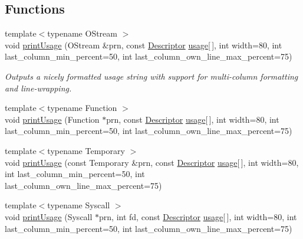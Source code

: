 \subsection*{Functions}
\begin{DoxyCompactItemize}
\item 
{\footnotesize template$<$typename O\-Stream $>$ }\\void \hyperlink{namespace_option_parser_a2458d437c7f439220d0b3581a5db56b1}{print\-Usage} (O\-Stream \&prn, const \hyperlink{struct_option_parser_1_1_descriptor}{Descriptor} \hyperlink{_selective_community_detection-_x_8cpp_ae4e685e845abde182eb8fc1f87b756ae}{usage}\mbox{[}$\,$\mbox{]}, int width=80, int last\-\_\-column\-\_\-min\-\_\-percent=50, int last\-\_\-column\-\_\-own\-\_\-line\-\_\-max\-\_\-percent=75)
\begin{DoxyCompactList}\small\item\em Outputs a nicely formatted usage string with support for multi-\/column formatting and line-\/wrapping. \end{DoxyCompactList}\item 
{\footnotesize template$<$typename Function $>$ }\\void \hyperlink{namespace_option_parser_a5901bd1e298e40bf2907f55cef137036}{print\-Usage} (Function $\ast$prn, const \hyperlink{struct_option_parser_1_1_descriptor}{Descriptor} \hyperlink{_selective_community_detection-_x_8cpp_ae4e685e845abde182eb8fc1f87b756ae}{usage}\mbox{[}$\,$\mbox{]}, int width=80, int last\-\_\-column\-\_\-min\-\_\-percent=50, int last\-\_\-column\-\_\-own\-\_\-line\-\_\-max\-\_\-percent=75)
\item 
{\footnotesize template$<$typename Temporary $>$ }\\void \hyperlink{namespace_option_parser_a8df0d17480241e36488d873a068c69e6}{print\-Usage} (const Temporary \&prn, const \hyperlink{struct_option_parser_1_1_descriptor}{Descriptor} \hyperlink{_selective_community_detection-_x_8cpp_ae4e685e845abde182eb8fc1f87b756ae}{usage}\mbox{[}$\,$\mbox{]}, int width=80, int last\-\_\-column\-\_\-min\-\_\-percent=50, int last\-\_\-column\-\_\-own\-\_\-line\-\_\-max\-\_\-percent=75)
\item 
{\footnotesize template$<$typename Syscall $>$ }\\void \hyperlink{namespace_option_parser_a598e7060eca553d3ff49580521d74794}{print\-Usage} (Syscall $\ast$prn, int fd, const \hyperlink{struct_option_parser_1_1_descriptor}{Descriptor} \hyperlink{_selective_community_detection-_x_8cpp_ae4e685e845abde182eb8fc1f87b756ae}{usage}\mbox{[}$\,$\mbox{]}, int width=80, int last\-\_\-column\-\_\-min\-\_\-percent=50, int last\-\_\-column\-\_\-own\-\_\-line\-\_\-max\-\_\-percent=75)

\end{DoxyCompactItemize}
